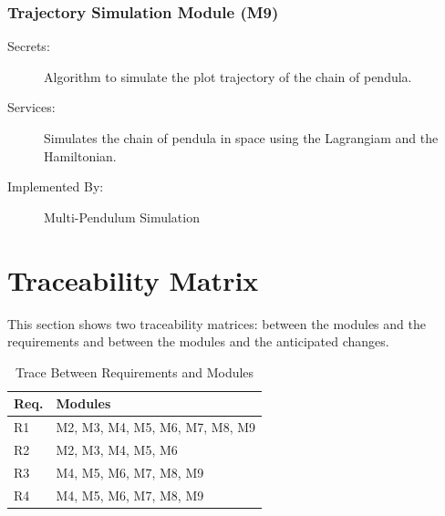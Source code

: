 \documentclass[12pt, titlepage]{article}
\newcommand{\mref}[1]{M\ref{#1}}
\newcommand{\progname}{Multi-Pendulum Simulation }
\begin{document}
\subsubsection{Trajectory Simulation Module (M9)}
\label{MG_SMHSim}
\begin{description}
\item[Secrets:] Algorithm to simulate the plot trajectory of the chain of pendula.
\item[Services:] Simulates the chain of pendula in space using the Lagrangiam
and the Hamiltonian.
\item[Implemented By:] \progname{}
\end{description}

\section{Traceability Matrix} \label{SecTM}

This section shows two traceability matrices: between the modules and the
requirements and between the modules and the anticipated changes.

\begin{table}[H]
\centering
\begin{tabular}{p{} p{}}
\toprule
\textbf{Req.} & \textbf{Modules}\\
\midrule
R1 & M2, M3, M4, M5, M6, M7, M8, M9\\%
R2 & M2, M3, M4, M5, M6\\%
R3 & M4, M5, M6, M7, M8, M9\\%
R4 & M4, M5, M6, M7, M8, M9\\%
\bottomrule
\end{tabular}
\caption{Trace Between Requirements and Modules}
\label{TblRT}
\end{table}
\end{document}
